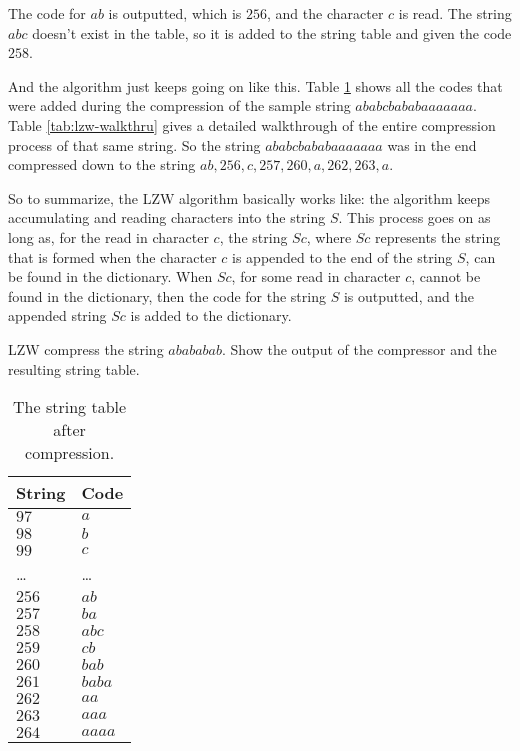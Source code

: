 The code for $ab$ is outputted, which is $256$, and the character $c$ is
read. The string $abc$ doesn't exist in the table, so it is
added to the string table and given the code $258$.

And the algorithm just keeps going on like this. Table
\ref{tab:str-tab-str} shows all the codes that were added during the
compression of the sample string $ababcbababaaaaaaa$. Table
\ref{tab:lzw-walkthru} gives a detailed walkthrough of the entire
compression process of that same string. So the string
$ababcbababaaaaaaa$ was in the end compressed down to the
string $ab,256,c,257,260,a,262,263,a$.

So to summarize, the LZW algorithm basically works like: the algorithm
keeps accumulating and reading characters into the string $S$. This
process goes on as long as, for the read in character $c$, the string
$Sc$, where $Sc$ represents the string that is formed when the
character $c$ is appended to the end of the string $S$, can be found
in the dictionary. When $Sc$, for some read in character $c$, cannot
be found in the dictionary, then the code for the string $S$ is
outputted, and the appended string $Sc$ is added to the dictionary.

\begin{Exercise}[label={lzw-compress}]

  LZW compress the string $abababab$. Show the output of the
  compressor and the resulting string table.

\end{Exercise}

\begin{table}
  \centering
  \begin{tabular}{ll}
    \toprule
    String & Code \\
    \midrule
    $97$ & $a$ \\
    $98$ & $b$ \\
    $99$ & $c$ \\
    \dots & \dots \\
    $256$ & $ab$ \\
    $257$ & $ba$ \\
    $258$ & $abc$ \\
    $259$ & $cb$ \\
    $260$ & $bab$ \\
    $261$ & $baba$ \\
    $262$ & $aa$ \\
    $263$ & $aaa$ \\
    $264$ & $aaaa$ \\
    \bottomrule
  \end{tabular}
  \caption{The string table after compression.}
  \label{tab:str-tab-str}
\end{table}

